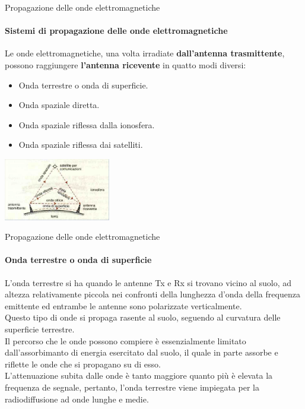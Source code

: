 \documentclass[aspectratio=169]{beamer}
\newcommand*{\vet}{\fontfamily{qzc}\selectfont}
\begin{document}
\begin{frame}{Propagazione delle onde elettromagnetiche}
	\framesubtitle{Sistemi di propagazione delle onde elettromagnetiche}
	Le onde elettromagnetiche, una volta irradiate \textbf{dall'antenna trasmittente}, possono raggiungere \textbf{l'antenna ricevente} in quatto modi diversi:\\
	 \medskip
	 \begin{itemize}
	 	\item Onda terrestre o onda di superficie.
	 	\item Onda spaziale diretta.
	 	\item Onda spaziale riflessa dalla ionosfera.
	 	\item Onda spaziale riflessa dai satelliti.
	 \end{itemize}
 \medskip
 \centering
 \includegraphics[width=0.35\textwidth]{Imgs/Propagazione}
	\end{frame}

\begin{frame}{Propagazione delle onde elettromagnetiche}
	\framesubtitle{Onda terrestre o onda di superficie}
	L'onda terrestre si ha quando le antenne {\vet Tx} e {\vet Rx} si trovano vicino al suolo, ad altezza relativamente piccola nei confronti della lunghezza d'onda della frequenza emittente ed entrambe le antenne sono polarizzate verticalmente.\\
	Questo tipo di onde si propaga rasente al suolo, seguendo al curvatura delle superficie terrestre.\\
	Il percorso che le onde possono compiere è essenzialmente limitato dall'assorbimanto di energia esercitato dal suolo, il quale in parte assorbe e riflette le onde che si propagano su di esso.\\
	L'attenuazione subita dalle onde è tanto maggiore quanto più è elevata la frequenza de segnale, pertanto, l'onda terrestre viene impiegata per la radiodiffusione ad onde lunghe e medie.\\	
\end{frame}
\end{document}
